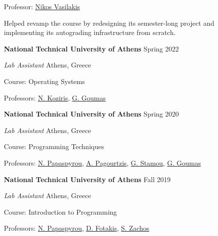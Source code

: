 \documentclass[margin,11pt]{resume}
\newcommand{\descriptionVSpace}{\vspace{0.5ex}\xspace}
\newcommand{\subsectionVSpace}{\vspace{4.5ex}\xspace}
\newcommand{\sectionVSpace}{\vspace{1ex}\xspace} %
\newcommand{\teachingVSpace}{\vspace{3ex}\xspace} %
\newcommand{\header}[1]{\textbf{#1}\xspace}
\newcommand{\institution}[1]{\header{#1}\xspace}
\newcommand{\place}[1]{#1\xspace}
\newcommand{\poster}[1]{\header{#1}\xspace}
\newcommand{\teachingRole}[1]{\textit{#1}\xspace}
\newcommand{\singleDate}[1]{#1\xspace}
\newcommand{\stitle}[1]{#1:\xspace}
\newlength{\cvsectionbodyoffset}
\newlength{\cvsectionwidestheaderwidth}
\newcommand{\recordCvSectionHeaderWidth}{%
	\ifdim\wd\cvsectionheaderbox>\cvsectionwidestheaderwidth
		\global\cvsectionwidestheaderwidth=\wd\cvsectionheaderbox
	\fi
}
\newcommand{\entryNeedspace}{\par\Needspace{2\baselineskip}}
\newenvironment{jobDuties}{\descriptionVSpace}{\par}
\newenvironment{rSection}[1]{%
	\par
	\setCvSectionHeader{#1}%
	\recordCvSectionHeaderWidth%
	\begin{list}{}{%
		\setlength{\leftmargin}{\cvsectionbodyoffset}%
		\setlength{\rightmargin}{0pt}%
		\setlength{\labelwidth}{\cvsectionbodyoffset}%
		\setlength{\labelsep}{0pt}%
		\setlength{\itemindent}{0pt}%
		\setlength{\listparindent}{0pt}%
		\setlength{\topsep}{0pt}%
		\setlength{\partopsep}{0pt}%
		\setlength{\parsep}{0pt}%
		\setlength{\itemsep}{0pt}%
		\renewcommand{\makelabel}[1]{\makebox[\labelwidth][l]{\raisebox{0pt}[0pt][0pt]{##1}}}%
	}%
	\item[\usebox{\cvsectionheaderbox}]%
}{\end{list}\sectionVSpace\par}
\newenvironment{rSubsection}{\entryNeedspace}{\par\subsectionVSpace}
\newenvironment{teachingItem}{\entryNeedspace}{\par\teachingVSpace} %
\begin{document}
\begin{resume}
\begin{rSection}{Teaching}
\begin{teachingItem}
			\stitle{Professor} \href{https://nikos.vasilak.is}{Nikos Vasilakis}

			\begin{jobDuties}
				Helped revamp the course by redesigning its semester-long project and implementing its autograding infrastructure from scratch.
			\end{jobDuties}
		\end{teachingItem}

		\begin{teachingItem}
			\institution{National Technical University of Athens} \hfill \singleDate{Spring 2022}

			\teachingRole{Lab Assistant} \hfill \place{Athens, Greece}

			\stitle{Course} Operating Systems

			\stitle{Professors} \href{http://www.cslab.ntua.gr/~nkoziris/}{N. Koziris}, \href{http://www.cslab.ntua.gr/~goumas/}{G. Goumas}
		\end{teachingItem}

		\begin{teachingItem}
			\institution{National Technical University of Athens} \hfill \singleDate{Spring 2020}

			\teachingRole{Lab Assistant} \hfill \place{Athens, Greece}

			\stitle{Course} Programming Techniques

			\stitle{Professors} \href{http://www.softlab.ntua.gr/~nickie/}{N. Papaspyrou}, \href{http://users.softlab.ntua.gr/~pagour/}{A. Pagourtzis}, \href{http://www.image.ntua.gr/~gstam/}{G. Stamou}, \href{http://www.cslab.ntua.gr/~goumas/}{G. Goumas}
		\end{teachingItem}

		\begin{teachingItem}
			\institution{National Technical University of Athens} \hfill \singleDate{Fall 2019}

			\teachingRole{Lab Assistant} \hfill \place{Athens, Greece}

			\stitle{Course} Introduction to Programming

			\stitle{Professors} \href{http://www.softlab.ntua.gr/~nickie/}{N. Papaspyrou}, \href{http://www.softlab.ntua.gr/~fotakis/}{D. Fotakis}, \href{https://en.wikipedia.org/wiki/Stathis_Zachos}{S. Zachos}
		\end{teachingItem}
	\end{rSection}



\end{resume}
\end{document}
